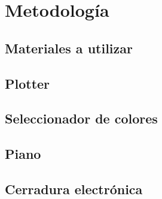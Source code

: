 \newpage

\section{Metodología}

\subsection{Materiales a utilizar}

\subsection{Plotter}

\subsection{Seleccionador de colores}

\subsection{Piano}

\subsection{Cerradura electrónica}
